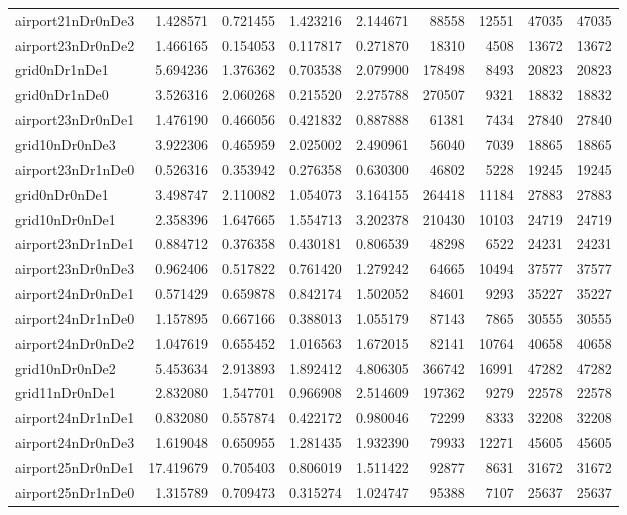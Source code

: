 \begin{longtable}{|l|r|r|r|r|r|r|r|r|}
airport21nDr0nDe3 & 1.428571 & 0.721455 & 1.423216 & 2.144671 & 88558 & 12551 & 47035 & 47035 \\
airport23nDr0nDe2 & 1.466165 & 0.154053 & 0.117817 & 0.271870 & 18310 & 4508 & 13672 & 13672 \\
grid0nDr1nDe1 & 5.694236 & 1.376362 & 0.703538 & 2.079900 & 178498 & 8493 & 20823 & 20823 \\
grid0nDr1nDe0 & 3.526316 & 2.060268 & 0.215520 & 2.275788 & 270507 & 9321 & 18832 & 18832 \\
airport23nDr0nDe1 & 1.476190 & 0.466056 & 0.421832 & 0.887888 & 61381 & 7434 & 27840 & 27840 \\
grid10nDr0nDe3 & 3.922306 & 0.465959 & 2.025002 & 2.490961 & 56040 & 7039 & 18865 & 18865 \\
airport23nDr1nDe0 & 0.526316 & 0.353942 & 0.276358 & 0.630300 & 46802 & 5228 & 19245 & 19245 \\
grid0nDr0nDe1 & 3.498747 & 2.110082 & 1.054073 & 3.164155 & 264418 & 11184 & 27883 & 27883 \\
grid10nDr0nDe1 & 2.358396 & 1.647665 & 1.554713 & 3.202378 & 210430 & 10103 & 24719 & 24719 \\
airport23nDr1nDe1 & 0.884712 & 0.376358 & 0.430181 & 0.806539 & 48298 & 6522 & 24231 & 24231 \\
airport23nDr0nDe3 & 0.962406 & 0.517822 & 0.761420 & 1.279242 & 64665 & 10494 & 37577 & 37577 \\
airport24nDr0nDe1 & 0.571429 & 0.659878 & 0.842174 & 1.502052 & 84601 & 9293 & 35227 & 35227 \\
airport24nDr1nDe0 & 1.157895 & 0.667166 & 0.388013 & 1.055179 & 87143 & 7865 & 30555 & 30555 \\
airport24nDr0nDe2 & 1.047619 & 0.655452 & 1.016563 & 1.672015 & 82141 & 10764 & 40658 & 40658 \\
grid10nDr0nDe2 & 5.453634 & 2.913893 & 1.892412 & 4.806305 & 366742 & 16991 & 47282 & 47282 \\
grid11nDr0nDe1 & 2.832080 & 1.547701 & 0.966908 & 2.514609 & 197362 & 9279 & 22578 & 22578 \\
airport24nDr1nDe1 & 0.832080 & 0.557874 & 0.422172 & 0.980046 & 72299 & 8333 & 32208 & 32208 \\
airport24nDr0nDe3 & 1.619048 & 0.650955 & 1.281435 & 1.932390 & 79933 & 12271 & 45605 & 45605 \\
airport25nDr0nDe1 & 17.419679 & 0.705403 & 0.806019 & 1.511422 & 92877 & 8631 & 31672 & 31672 \\
airport25nDr1nDe0 & 1.315789 & 0.709473 & 0.315274 & 1.024747 & 95388 & 7107 & 25637 & 25637 \\

\end{longtable}
